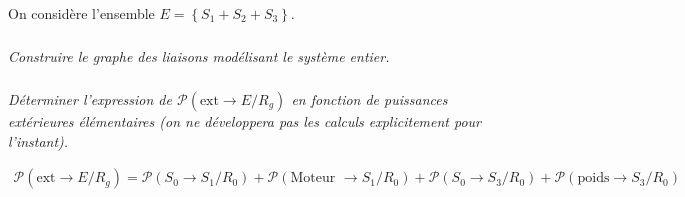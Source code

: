 \documentclass[10pt,fleqn]{article} %
\begin{document}
\begin{multicols}{2}
On considère l'ensemble $E=\left\{S_1+S_2+S_3\right\}$.

\subparagraph{}\textit{Construire le graphe des liaisons modélisant le système entier.}

\ifprof\begin{corrige}
\begin{center}
\end{center}
\end{corrige}\else\fi

\subparagraph{}\textit{Déterminer l'expression de $\mathcal{P}(\text{ext} \rightarrow E/R_g)$ en fonction de puissances extérieures élémentaires (on ne développera pas les calculs explicitement pour l'instant).}
\ifprof\begin{corrige}
\begin{align*}
\mathcal{P}(\text{ext}\rightarrow E/R_g)=\mathcal{P}(S_0 \rightarrow S_1/R_0)+\mathcal{P}(\text{Moteur }\rightarrow S_1/R_0)
+\mathcal{P}(S_0 \rightarrow S_3/R_0)+\mathcal{P}(\text{poids} \rightarrow S_3/R_0)
\end{align*}
\end{corrige}\else\fi



\end{multicols}
\end{document}
